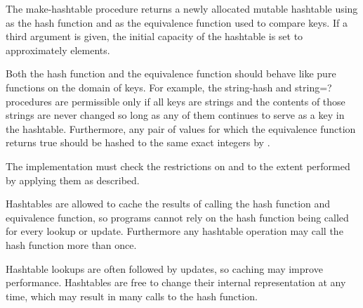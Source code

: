 \begin{entry}{%
}

The {\cf make-hashtable} procedure returns a newly allocated mutable
hashtable using  
as the hash function and  as the equivalence function used to 
compare keys.
If a third argument is given, the 
initial capacity of the hashtable is set to approximately  elements.

Both the hash function  and the equivalence
function  should behave like pure functions
on the domain of keys.  For example, the {\cf string-hash}
and {\cf string=?} procedures are permissible only if all
keys are strings and the contents of those strings are never
changed so long as any of them continues to serve as a key in
the hashtable.  Furthermore, any pair of values for which
the equivalence function  returns true should
be hashed to the same exact integers by 
.

\implresp The implementation must check the restrictions on
 and  to the extent performed by
applying them as described.

\begin{note}
Hashtables are allowed to cache the results of calling the
hash function and equivalence function, so programs cannot
rely on the hash function being called for every lookup or
update.  Furthermore any hashtable operation may call the
hash function more than once.
\end{note}

\begin{rationale}
Hashtable lookups are often followed by updates, so caching
may improve performance.  Hashtables are free to change
their internal representation at any time, which may result
in many calls to the hash function.
\end{rationale}

\end{entry}

